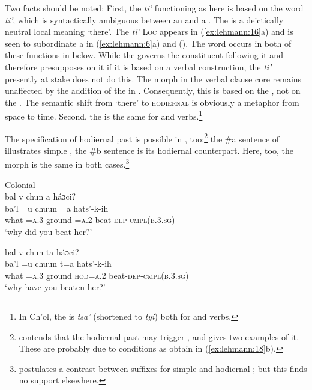 \documentclass[output=paper]{langsci/langscibook}
\begin{document}
Two facts should be noted: First, the \textit{ti’} functioning as  here is based on the word \textit{ti’}, which is syntactically ambiguous between an  and a . The  is a deictically neutral local  meaning ‘there’. The  \textit{ti’} \textsc{Loc} appears in (\ref{ex:lehmann:16}a) and is seen to subordinate a  in (\ref{ex:lehmann:6}a) and  (). The word occurs in both of these functions in  below. While the  governs the constituent following it and therefore presupposes  on it if it is based on a verbal construction, the \textit{ti’} presently at stake does not do this. The  morph in the verbal clause core remains unaffected by the addition of the  in . Consequently, this  is based on the , not on the . The semantic shift from ‘there’ to \textsc{hodiernal} is obviously a metaphor from space to time. Second, the  is the same for  and  verbs.\footnote{In Ch'ol, the   is \textit{tsa’} (shortened to \textit{tyi}) both for  and  verbs.}

The specification of hodiernal past is possible in , too:\footnote{\citet[17r]{SanBuenaventura1684} contends that the hodiernal past may trigger , and gives two examples of it. These are probably due to conditions as obtain in (\ref{ex:lehmann:18}b).} the \#a sentence of  illustrates simple , the \#b sentence is its hodiernal counterpart. Here, too, the  morph is the same in both cases.\footnote{\citet[41]{Coronel1620} postulates a contrast between  suffixes for simple and hodiernal ; but this finds no support elsewhere.}\newpage


\ea\label{ex:lehmann:18}
Colonial  \\
\ea 
 bal  v      chun  a      háɔci?\\
\gll ba'l  =u    chuun  =a    hats'-k-ih\\
  what  =\textsc{a.3}    ground  =\textsc{a.2}    beat-\textsc{dep-cmpl(b.3.sg)}\\
\glt ‘why did you beat her?’

\ex 
bal  v      chun  ta          háɔci?\\
\gll   ba'l  =u    chuun  t=a        hats'-k-ih\\
what  =\textsc{a.3}    ground  \textsc{hod=a.2}    beat-\textsc{dep-cmpl(b.3.sg}\textsc{)}\\
\glt ‘why have you beaten her?’ \citep[42]{Coronel1620}
\z
\z 
\end{document}
